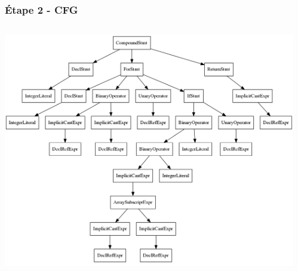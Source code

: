 \documentclass{beamer}
\begin{document}
\begin{frame}
\frametitle{Étape 2 - CFG}
\begin{columns}
    \begin{column}{0.5\textwidth}
\colorbox{white}{\includegraphics[scale=0.15]{AST.png}}
    \end{column}
    \begin{column}{0.5\textwidth}
\begin{center}

\end{center}
\end{column}
\end{columns}
\end{frame}
\end{document}
